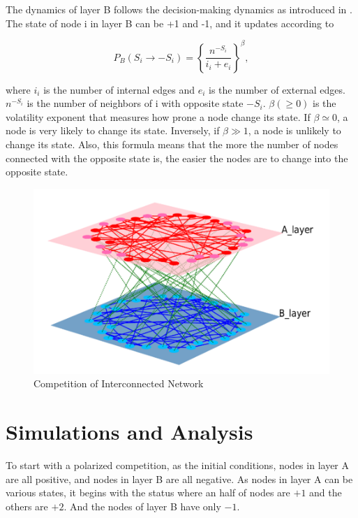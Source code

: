 \documentclass[english]{cccconf}
\begin{document}
The dynamics of layer B follows the decision-making dynamics as introduced in \cite{abrams2003, vazquez2010}. The state of node i in layer B can be +1 and -1, and it updates according to

\begin{equation}
P_B(S_i \rightarrow -S_i)= \left \{\frac{n^{-S_i}}{i_i + e_i}\right \}^\beta,
\end{equation}

where $i_i$ is the number of internal edges and $e_i$ is the number of external edges. $n^{-S_i}$ is the number of neighbors of i with opposite state $-S_i$. $\beta(\geq 0)$ is the volatility exponent that measures how prone a node change its state. If $\beta \simeq 0$, a node is very likely to change its state. Inversely, if $\beta \gg 1$, a node is unlikely to change its state. Also, this formula means that the more the number of nodes connected with the opposite state is, the easier the nodes are to change into the opposite state.\\
\begin{figure}[!htb]
  \centering
  \includegraphics[width=\hsize]{FIG1.png}
  \caption{Competition of Interconnected Network}
  \label{Fig1}
\end{figure}


\section{Simulations and Analysis}
To start with a polarized competition, as the initial conditions,  nodes in layer A are all positive, and nodes in layer B are all negative. As nodes in layer A can be various states, it begins with the status where an half of nodes are $+1$ and the others are $+2$. And the nodes of layer B have only $-1$. 
\end{document}
